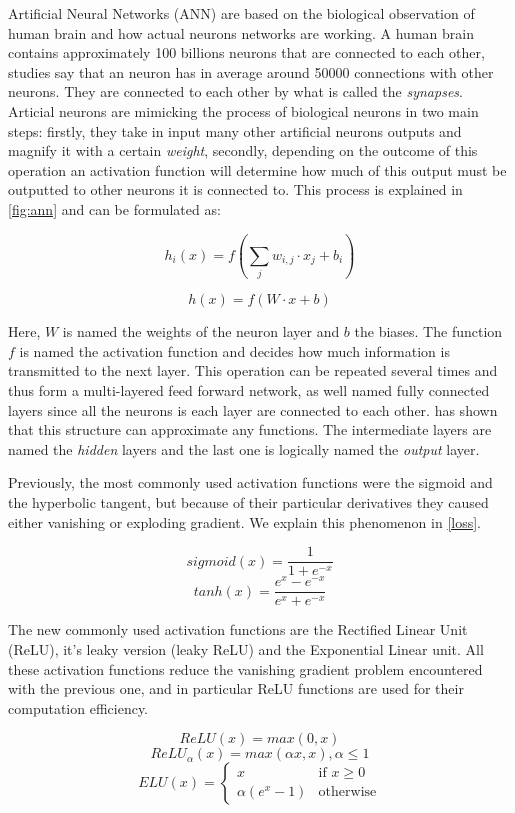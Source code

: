 \documentclass[master, tikz, final,11pt, dvipdfmx]{iscs-thesis}
\begin{document}
Artificial Neural Networks (ANN) are based on the biological observation of human brain and how actual neurons networks are working. A human brain contains approximately 100 billions neurons that are connected to each other, studies say that an neuron has in average around 50000 connections with other neurons. They are connected to each other by what is called the \textit{synapses}.
Articial neurons are mimicking the process of biological neurons in two main steps: firstly, they take in input many other artificial neurons outputs and magnify it with a certain \textit{weight}, secondly, depending on the outcome of this operation an activation function will determine how much of this output must be outputted to other neurons it is connected to. This process is explained in \autoref{fig:ann} and can be formulated as:


\[
	h_{i}(x) = f(\sum_{j}{w_{i,j}\cdot x_j} + b_i)
\]

\[
	h(x) = f(W \cdot x + b)
\]

Here, $W$ is named the weights of the neuron layer and $b$ the biases. The function $f$ is named the activation function and decides how much information is transmitted to the next layer. This operation can be repeated several times and thus form a multi-layered feed forward network, as well named fully connected layers since all the neurons is each layer are connected to each other. \cite{FFN} has shown that this structure can approximate any functions. The intermediate layers are named the \textit{hidden} layers and the last one is logically named the \textit{output} layer.

Previously, the most commonly used activation functions were the sigmoid and the hyperbolic tangent, but because of their particular derivatives they caused either vanishing or exploding gradient. We explain this phenomenon in \autoref{loss}. 

\[sigmoid(x)  = \frac{1}{1+e^{-x}}\]
\[tanh(x)  = \frac{e^x - e^{-x}}{e^x + e^{-x}}\]

The new commonly used activation functions are the Rectified Linear Unit (ReLU), it's leaky version (leaky ReLU) and the Exponential Linear unit. All these activation functions reduce the vanishing gradient problem encountered with the previous one, and in particular ReLU functions are used for their computation efficiency.

\[ReLU(x)  = max(0,x)\]
\[ReLU_{\alpha}(x)  = max(\alpha x, x), \alpha 	\leq 1 \]
\[ELU(x)  = \left\{
    \begin{array}{ll}
        x & \mbox{if } x \geq 0 \\
        \alpha (e^x-1) & \mbox{otherwise}
    \end{array}
\right. \]
\end{document}
